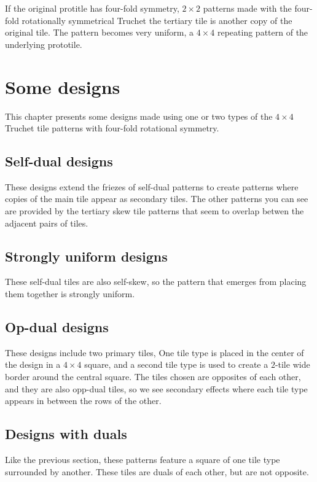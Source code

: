 \documentclass{tufte-book}
\begin{document}
\noindent
If the original protitle has four-fold symmetry,  $2\times 2$ patterns made with the four-fold rotationally symmetrical Truchet the tertiary tile is another copy of the original tile. The pattern becomes very uniform, a $4\times4$ repeating pattern of the underlying prototile.



\chapter{Some designs}
This chapter presents some designs made using one or two types of the $4\times 4$ Truchet tile patterns with four-fold rotational symmetry.

\section{Self-dual designs}
These designs extend the friezes of self-dual patterns to create patterns where copies of the main tile appear as secondary tiles. The other patterns you can see are provided by the tertiary skew tile patterns that seem to overlap betwen the adjacent pairs of tiles.

{
\setlength{\tabcolsep}{0pt}
\renewcommand{\arraystretch}{0}

}

\section{Strongly uniform designs}

These self-dual tiles are also self-skew, so the pattern that emerges from placing them together is strongly uniform.
{
\setlength{\tabcolsep}{0pt}
\renewcommand{\arraystretch}{0}

}

\section{Op-dual designs}
These designs include two primary tiles, One tile type is placed in the center of the design in a $4\times 4$ square, and a second tile type is used to create a $2$-tile wide border around the central square. The tiles chosen are opposites of each other, and they are also opp-dual tiles, so we see secondary effects where each tile type appears in between the rows of the other.
{
\setlength{\tabcolsep}{0pt}
\renewcommand{\arraystretch}{0}

}

\section{Designs with duals}
Like the previous section, these patterns feature a square of one tile type surrounded by another. These tiles are duals of each other, but are not opposite.
{
\setlength{\tabcolsep}{0pt}
\renewcommand{\arraystretch}{0}

}
\end{document}
